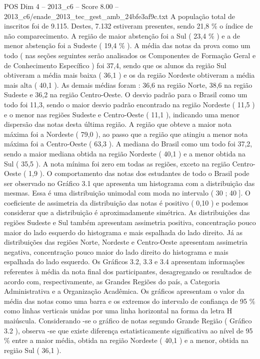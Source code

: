 \begin{textsample}{POS Dim 4 – 2013\_c6 – Score 8.00 – 2013\_c6/enade\_2013\_tec\_gest\_amb\_24bfe3af9c.txt}
A população total de inscritos foi de 9.115.
Destes, 7.132 estiveram presentes, sendo 21,8 \% o índice de não comparecimento.
A região de maior abstenção foi a Sul ( 23,4 \% ) e a de menor abstenção foi a Sudeste ( 19,4 \% ).
A média das notas da prova como um todo ( nas seções seguintes serão analisados os Componentes de Formação Geral e de Conhecimento Específico ) foi 37,4, sendo que os alunos da região Sul obtiveram a média mais baixa ( 36,1 ) e os da região Nordeste obtiveram a média mais alta ( 40,1 ).
As demais médias foram : 36,6 na região Norte, 38,6 na região Sudeste e 36,2 na região Centro-Oeste.
O desvio padrão para o Brasil como um todo foi 11,3, sendo o maior desvio padrão encontrado na região Nordeste ( 11,5 ) e o menor nas regiões Sudeste e Centro-Oeste ( 11,1 ), indicando uma menor dispersão das notas desta última região.
A região que obteve a maior nota máxima foi a Nordeste ( 79,0 ), ao passo que a região que atingiu a menor nota máxima foi a Centro-Oeste ( 63,3 ).
A mediana do Brasil como um todo foi 37,2, sendo a maior mediana obtida na região Nordeste ( 40,1 ) e a menor obtida na Sul ( 35,5 ).
A nota mínima foi zero em todas as regiões, exceto na região Centro-Oeste ( 1,9 ).
O comportamento das notas dos estudantes de todo o Brasil pode ser observado no Gráfico 3.1 que apresenta um histograma com a distribuição das mesmas.
Essa é uma distribuição unimodal com moda no intervalo ( 30 ; 40 ].
O coeficiente de assimetria da distribuição das notas é positivo ( 0,10 ) e podemos considerar que a distribuição é aproximadamente simétrica.
As distribuições das regiões Sudeste e Sul também apresentam assimetria positiva, concentração pouco maior do lado esquerdo do histograma e mais espalhada do lado direito.
Já as distribuições das regiões Norte, Nordeste e Centro-Oeste apresentam assimetria negativa, concentração pouco maior do lado direito do histograma e mais espalhada do lado esquerdo.
Os Gráficos 3.2, 3.3 e 3.4 apresentam informações referentes à média da nota final dos participantes, desagregando os resultados de acordo com, respectivamente, as Grandes Regiões do país, a Categoria Administrativa e a Organização Acadêmica.
Os gráficos apresentam o valor da média das notas como uma barra e os extremos do intervalo de confiança de 95 \% como linhas verticais unidas por uma linha horizontal na forma da letra H maiúscula.
Considerando -se o gráfico de notas segundo Grande Região ( Gráfico 3.2 ), observa -se que existe diferença estatisticamente significativa ao nível de 95 \% entre a maior média, obtida na região Nordeste ( 40,1 ) e a menor, obtida na região Sul ( 36,1 ).

\end{textsample}
